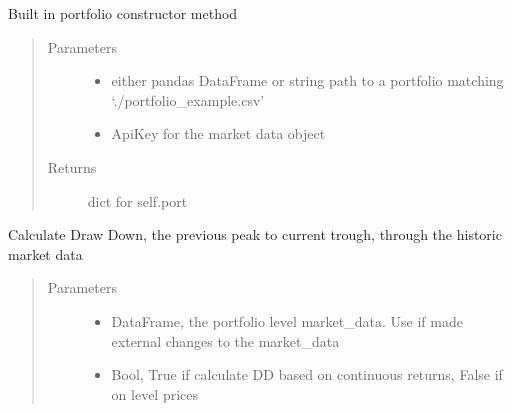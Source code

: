 \documentclass[letterpaper,10pt,english]{sphinxmanual}
\begin{document}
\begin{fulllineitems}
\begin{fulllineitems}
\label{\detokenize{securities:risk_dash.securities.Portfolio.construct_portfolio_csv}}
Built in portfolio constructor method
\begin{quote}\begin{description}
\item[{Parameters}] \leavevmode\begin{itemize}
\item {} 
 \textendash{} either pandas DataFrame or string path to a portfolio matching ‘./portfolio\_example.csv’

\item {} 
 \textendash{} ApiKey for the market data object

\end{itemize}

\item[{Returns}] \leavevmode
dict for self.port

\end{description}\end{quote}

\end{fulllineitems}


\begin{fulllineitems}
\label{\detokenize{securities:risk_dash.securities.Portfolio.drawdown}}
Calculate Draw Down, the previous peak to current trough, through the historic market data
\begin{quote}\begin{description}
\item[{Parameters}] \leavevmode\begin{itemize}
\item {} 
 \textendash{} DataFrame, the portfolio level market\_data. Use if made external changes to the market\_data

\item {} 
 \textendash{} Bool, True if calculate DD based on continuous returns, False if on level prices


\end{itemize}
\end{description}
\end{quote}
\end{fulllineitems}
\end{fulllineitems}
\end{document}
